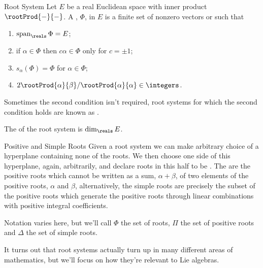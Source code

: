 \documentclass[fleqn]{NotesClass}
\DeclareMathOperator{\Span}{span}
\begin{document}
    \begin{dfn}{Root System}{}
        Let \(E\) be a real Euclidean space with inner product \(\rootProd{-}{-}\).
        A , \(\Phi\), in \(E\) is a finite set of nonzero vectors or  such that
        \begin{enumerate}
            \item \(\Span_{\reals} \Phi = E\);
            \item if \(\alpha \in \Phi\) then \(c \alpha \in \Phi\) only for \(c = \pm 1\);
            \item \(s_\alpha(\Phi) = \Phi\) for \(\alpha \in \Phi\);
            \item \(2\rootProd{\alpha}{\beta}/\rootProd{\alpha}{\alpha} \in \integers\).
        \end{enumerate}
        Sometimes the second condition isn't required, root systems for which the second condition holds are known as .
        
        The  of the root system is \(\dim_{\reals} E\).
    \end{dfn}
    
    \begin{dfn}{Positive and Simple Roots}{}
        Given a root system we can make arbitrary choice of a hyperplane containing none of the roots.
        We then choose one side of this hyperplane, again, arbitrarily, and declare roots in this half to be .
        The  are the positive roots which cannot be written as a sum, \(\alpha + \beta\), of two elements of the positive roots, \(\alpha\) and \(\beta\), alternatively, the simple roots are precisely the subset of the positive roots which generate the positive roots through linear combinations with positive integral coefficients.
    \end{dfn}
    
    \begin{ntn}{}{}
        Notation varies here, but we'll call \(\Phi\) the set of roots, \(\Pi\) the set of positive roots and \(\Delta\) the set of simple roots.
    \end{ntn}
    
    It turns out that root systems actually turn up in many different areas of mathematics, but we'll focus on how they're relevant to Lie algebras.
    
\end{document}
